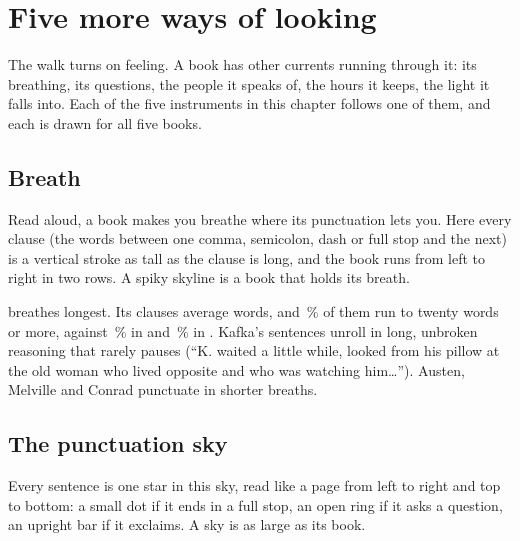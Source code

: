 \chapter{Five more ways of looking}
\label{ch:more}

The walk turns on feeling. A book has other currents running through it: its
breathing, its questions, the people it speaks of, the hours it keeps, the
light it falls into. Each of the five instruments in this chapter follows one
of them, and each is drawn for all five books.

\clearpage
\section{Breath}


\noindent Read aloud, a book makes you breathe where its punctuation lets you.
Here every clause (the words between one comma, semicolon, dash or full stop
and the next) is a vertical stroke as tall as the clause is long, and the
book runs from left to right in two rows. A spiky skyline is a book that holds
its breath.

 breathes longest. Its clauses average 
words, and \,\% of them run to twenty words or
more, against \,\% in
 and \,\% in .
Kafka's sentences unroll in long, unbroken reasoning that rarely pauses
(``K. waited a little while, looked from his pillow at the old woman who lived
opposite and who was watching him\ldots''). Austen, Melville and Conrad punctuate
in shorter breaths.

\clearpage
\section{The punctuation sky}


\noindent Every sentence is one star in this sky, read like a page from left to
right and top to bottom: a small dot if it ends in a full stop, an open ring if
it asks a question, an upright bar if it exclaims. A sky is as large as its book.

